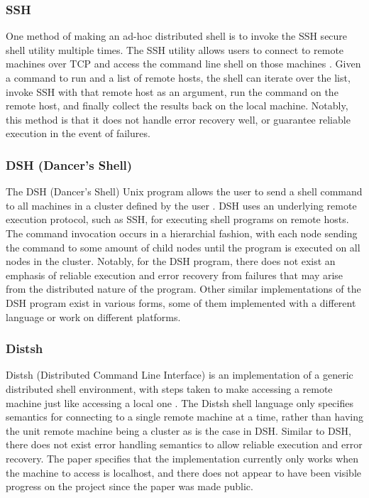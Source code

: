 \documentclass[twoside]{report}
\begin{document}
\subsubsection{SSH}
One method of making an ad-hoc distributed shell is to invoke the SSH secure shell utility multiple times.
The SSH utility allows users to connect to remote machines over TCP and access the command line shell on those machines \cite{rfc4251}.
Given a command to run and a list of remote hosts, the shell can iterate over the list, invoke SSH with that remote host as an argument, run the command on the remote host, and finally collect the results back on the local machine.
Notably, this method is that it does not handle error recovery well, or guarantee reliable execution in the event of failures.

\subsubsection{DSH (Dancer's Shell)}
The DSH (Dancer's Shell) Unix program allows the user to send a shell command to all machines in a cluster defined by the user \cite{dshdancer}.
DSH uses an underlying remote execution protocol, such as SSH, for executing shell programs on remote hosts.
The command invocation occurs in a hierarchial fashion, with each node sending the command to some amount of child nodes until the program is executed on all nodes in the cluster.
Notably, for the DSH program, there does not exist an emphasis of reliable execution and error recovery from failures that may arise from the distributed nature of the program.
Other similar implementations of the DSH program exist in various forms, some of them implemented with a different language or work on different platforms.

\subsubsection{Distsh}
Distsh (Distributed Command Line Interface) is an implementation of a generic distributed shell environment, with steps taken to make accessing a remote machine just like accessing a local one \cite{distsh}.
The Distsh shell language only specifies semantics for connecting to a single remote machine at a time, rather than having the unit remote machine being a cluster as is the case in DSH.
Similar to DSH, there does not exist error handling semantics to allow reliable execution and error recovery.
The paper specifies that the implementation currently only works when the machine to access is localhost, and there does not appear to have been visible progress on the project since the paper was made public.
\end{document}

